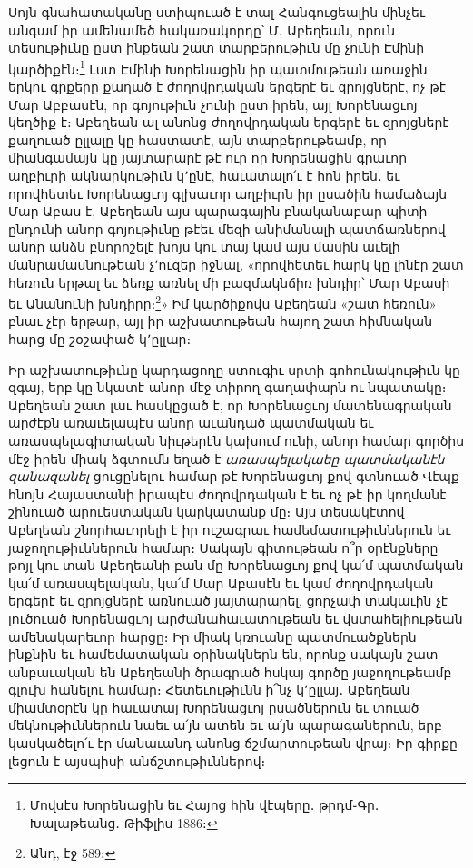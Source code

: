 \documentclass{article}
\begin{document}
{Սոյն գնահատականը ստիպուած է տալ Հանգուցեալին մինչեւ անգամ իր ամենամեծ հակառակորդը՝ Մ․ Աբեղեան, որուն տեսութիւնը ըստ ինքեան շատ տարբերութիւն մը չունի Էմինի կարծիքէն։\footnote{Մովսէս Խորենացին եւ Հայոց հին վէպերը․ թրդմ֊Գր․ Խալաթեանց․ Թիֆլիս 1886։} Լստ Էմինի Խորենացին իր պատմութեան առաջին երկու գրքերը քաղած է ժողովրդական երգերէ եւ զրոյցներէ, ոչ թէ Մար Աբբասէն, որ գոյութիւն չունի ըստ իրեն, այլ Խորենացւոյ կեղծիք է։ Աբեղեան ալ անոնց ժողովրդական երգերէ եւ զրոյցներէ քաղուած ըլլալը կը հաստատէ, այն տարբերութեամբ, որ միանգամայն կը յայտարարէ թէ ուր որ Խորենացին գրաւոր աղբիւրի ակնարկութիւն կ՚ընէ, հաւատալո՛ւ է հոն իրեն․ եւ որովհետեւ Խորենացւոյ գլխաւոր աղբիւրն իր ըսածին համաձայն Մար Աբաս է, Աբեղեան այս պարագային բնականաբար պիտի ընդունի անոր գոյութիւնը թէեւ մեզի անիմանալի պատճառներով անոր անձն բնորոշելէ խոյս կու տայ կամ այս մասին աւելի մանրամասնութեան չ՚ուզեր իջնալ, «որովհետեւ հարկ կը լինէր շատ հեռուն երթալ եւ ձեռք առնել մի բազմակնճիռ խնդիր՝ Մար Աբասի եւ Անանունի խնդիրը։\footnote{Անդ, էջ 589։}» Իմ կարծիքովս Աբեղեան «շատ հեռուն» բնաւ չէր երթար, այլ իր աշխատութեան հայող շատ հիմնական հարց մը շօշափած կ՚ըլլար։

Իր աշխատութիւնը կարդացողը ստուգիւ սրտի գոհունակութիւն կը զգայ, երբ կը նկատէ անոր մէջ տիրող գաղափարն ու նպատակը։ Աբեղեան շատ լաւ հասկըցած է, որ Խորենացւոյ մատենագրական արժէքն առաւելապէս անոր աւանդած պատմական եւ առասպելագիտական նիւթերէն կախում ունի, անոր համար գործիս մէջ իրեն միակ ձգտումն եղած է \emph{առասպելակաեը պատմականէն զանազանել} ցուցընելու համար թէ Խորենացւոյ քով գտնուած Վէպք հնոյն Հայաստանի իրապէս ժողովրդական է եւ ոչ թէ իր կողմանէ շինուած արուեստական կարկատանք մը։ Այս տեսակէտով Աբեղեան շնորհաւորելի է իր ուշագրաւ համեմատութիւններուն եւ յաջողութիւններուն համար։ Սակայն գիտութեան ո՞ր օրէնքները թոյլ կու տան Աբեղեանի բան մը Խորենացւոյ քով կա՛մ պատմական կա՛մ առասպելական, կա՛մ Մար Աբասէն եւ կամ ժողովրդական երգերէ եւ զրոյցներէ առնուած յայտարարել, ցորչափ տակաւին չէ լուծուած Խորենացւոյ արժանահաւատութեան եւ վստահելիութեան ամենակարեւոր հարցը։ Իր միակ կռուանը պատմուածքներն ինքնին եւ համեմատական օրինակներն են, որոնք սակայն շատ անբաւական են Աբեղեանի ծրագրած հսկայ գործը յաջողութեամբ գլուխ հանելու համար։ Հետեւութիւնն ի՞նչ կ՚ըլլայ․ Աբեղեան միամտօրէն կը հաւատայ Խորենացւոյ ըսածներուն եւ տուած մեկնութիւններուն նաեւ ա՛յն ատեն եւ ա՛յն պարագաներուն, երբ կասկածելո՛ւ էր մանաւանդ անոնց ճշմարտութեան վրայ։ Իր գիրքը լեցուն է այսպիսի անճշտութիւններով։

}
\end{document}
